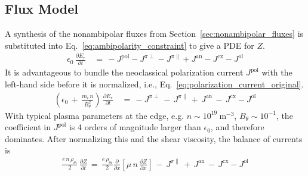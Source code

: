 \subsection{Flux Model}\label{ssec:flux_Z_equation}
A synthesis of the nonambipolar fluxes from Section~\ref{sec:nonambipolar_fluxes} is substituted into Eq.~\ref{eq:ambipolarity_constraint} to give a PDE for $Z$.
\begin{align} %
	\epsilon_0 \, \frac{\partial E_r}{\partial t} \,&=\, -J^\text{pol}
		- J^{\pi\perp} - J^{\pi\parallel} + J^\text{an} - J^\text{cx}
		- J^\text{ol} \label{eq:current_sum}
\end{align}
It is advantageous to bundle the neoclassical polarization current $J^\text{pol}$ with the left-hand side before it is normalized, i.e., Eq.~\ref{eq:polarization_current_original}.
\begin{align} %
	\left(\epsilon_0 \,+\, \frac{m_i \, n}{B_\theta^2}\right) \,
	\frac{\partial E_r}{\partial t} \,&=\, -J^{\pi\perp} \,-\, J^{\pi\parallel}
		\,+\, J^\text{an} \,-\, J^\text{cx} - J^\text{ol}
\end{align}
With typical plasma parameters at the edge, e.g. $n \sim 10^{19}~\text{m}^{-3}$, $B_\theta \sim 10^{-1}$, the coefficient in $J^\text{pol}$ is 4 orders of magnitude larger than $\epsilon_0$, and therefore dominates.
After normalizing this and the shear viscosity, the balance of currents is
\begin{align} %
	\frac{e \, n \, \rho_{\theta i}}{2} \, \frac{\partial Z}{\partial t}
		\,=\, \frac{e \, \rho_{\theta i}}{2} \frac{\partial}{\partial x}
		\left[\mu \, n \, \frac{\partial Z}{\partial x}\right] \,-\,
		J^{\pi\parallel} \,+\, J^\text{an} \,-\, J^\text{cx} - J^\text{ol}
		\label{eq:normalized_Z_equation}
\end{align}
